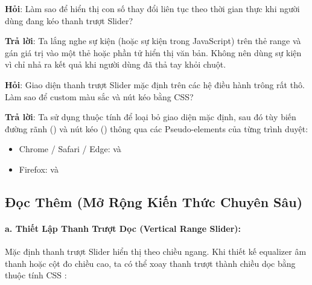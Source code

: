 \begin{noteBox}
\textbf{Hỏi}: Làm sao để hiển thị con số thay đổi liên tục theo thời gian thực khi người dùng đang kéo thanh trượt Slider?
\par\vspace{3pt}
\textbf{Trả lời}: Ta lắng nghe sự kiện  (hoặc sự kiện  trong JavaScript) trên thẻ range và gán giá trị  vào một thẻ  hoặc phần tử hiển thị văn bản. Không nên dùng sự kiện  vì  chỉ nhả ra kết quả khi người dùng đã thả tay khỏi chuột.
\end{noteBox}

\begin{noteBox}
\textbf{Hỏi}: Giao diện thanh trượt Slider mặc định trên các hệ điều hành trông rất thô. Làm sao để custom màu sắc và nút kéo bằng CSS?
\par\vspace{3pt}
\textbf{Trả lời}: Ta sử dụng thuộc tính  để loại bỏ giao diện mặc định, sau đó tùy biến đường rãnh () và nút kéo () thông qua các Pseudo-elements của từng trình duyệt:
\begin{itemize}[leftmargin=1.5em, itemsep=2pt, parsep=0pt]
    \item Chrome / Safari / Edge:  và 
    \item Firefox:  và 
\end{itemize}
\end{noteBox}

\subsection{Đọc Thêm (Mở Rộng Kiến Thức Chuyên Sâu)}
\label{subsec:range_advanced_readmore}

\paragraph{a. Thiết Lập Thanh Trượt Dọc (Vertical Range Slider):}
Mặc định thanh trượt Slider hiển thị theo chiều ngang. Khi thiết kế equalizer âm thanh hoặc cột đo chiều cao, ta có thể xoay thanh trượt thành chiều dọc bằng thuộc tính CSS :

